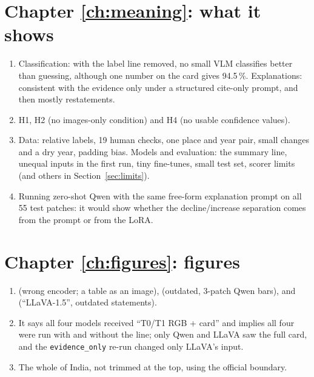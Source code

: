 \section*{Chapter \ref{ch:meaning}: what it shows}
\begin{enumerate}
  \item Classification: with the label line removed, no small VLM classifies better than guessing, although one number on the card gives 94.5\,\%. Explanations: consistent with the evidence only under a structured cite-only prompt, and then mostly restatements.
  \item H1, H2 (no images-only condition) and H4 (no usable confidence values).
  \item Data: relative labels, 19 human checks, one place and year pair, small changes and a dry year, padding bias. Models and evaluation: the summary line, unequal inputs in the first run, tiny fine-tunes, small test set, scorer limits (and others in Section~\ref{sec:limits}).
  \item Running zero-shot Qwen with the same free-form explanation prompt on all 55 test patches: it would show whether the decline/increase separation comes from the prompt or from the LoRA.
\end{enumerate}

\section*{Chapter \ref{ch:figures}: figures}
\begin{enumerate}
  \item {} (wrong encoder; a table as an image),  (outdated, 3-patch Qwen bars),  and  (``LLaVA-1.5'', outdated statements).
  \item It says all four models received ``T0/T1 RGB + card'' and implies all four were run with and without the line; only Qwen and LLaVA saw the full card, and the \texttt{evidence\_only} re-run changed only LLaVA's input.
  \item The whole of India, not trimmed at the top, using the official boundary.
\end{enumerate}

